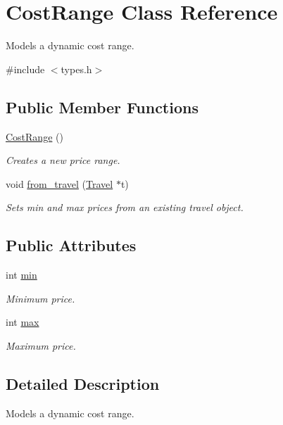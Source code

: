 \hypertarget{class_cost_range}{\section{Cost\-Range Class Reference}
\label{class_cost_range}
}


Models a dynamic cost range.  




{\ttfamily \#include $<$types.\-h$>$}

\subsection*{Public Member Functions}
\begin{DoxyCompactItemize}
\item 
\hyperlink{class_cost_range_a8b92d9b254a7184e694245de8f910089}{Cost\-Range} ()
\begin{DoxyCompactList}\small\item\em Creates a new price range. \end{DoxyCompactList}\item 
void \hyperlink{class_cost_range_ab7cf34051a0d4a757b4fc38f972d455b}{from\-\_\-travel} (\hyperlink{class_travel}{Travel} $\ast$t)
\begin{DoxyCompactList}\small\item\em Sets min and max prices from an existing travel object. \end{DoxyCompactList}\end{DoxyCompactItemize}
\subsection*{Public Attributes}
\begin{DoxyCompactItemize}
\item 
int \hyperlink{class_cost_range_ab9e6b517daae3ef23654e90f243b4f8d}{min}
\begin{DoxyCompactList}\small\item\em Minimum price. \end{DoxyCompactList}\item 
int \hyperlink{class_cost_range_a1f758d95074553812b9af90a57eee99d}{max}
\begin{DoxyCompactList}\small\item\em Maximum price. \end{DoxyCompactList}\end{DoxyCompactItemize}


\subsection{Detailed Description}
Models a dynamic cost range. 

